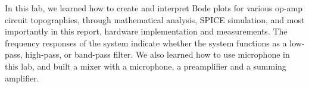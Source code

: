 In this lab, we learned how to create and interpret Bode plots for various op-amp circuit topographies, through mathematical analysis, SPICE simulation, and most importantly in this report, hardware implementation and measurements. The frequency responses of the system indicate whether the system functions as a low-pass, high-pass, or band-pass filter. \newline
\phantom{ } We also learned how to use microphone in this lab, and built a mixer with a microphone, a preamplifier and a summing amplifier.